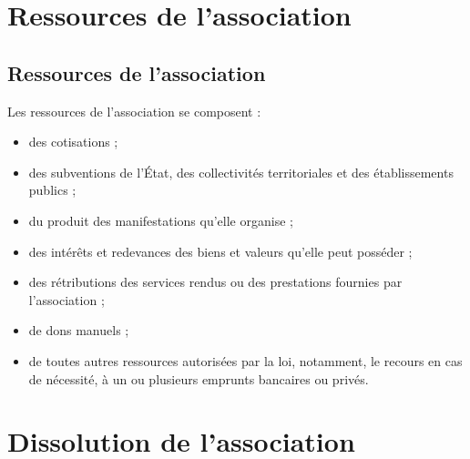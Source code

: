 \documentclass[a4paper,french,10pt]{article}
\newcommand{\article}[1]{\subsection{#1}\addtocounter{article}{1}}
\newcounter{article}
\begin{document}





\section{Ressources de l’association}

\article{Ressources de l’association}
\label{sec:ressources}
Les ressources de l’association se composent :
\begin{itemize}
\item des cotisations ;
  
\item des subventions de l’État, des collectivités territoriales et
des établissements publics ;

\item du produit des manifestations qu’elle organise ;

\item des intérêts et redevances des biens et valeurs qu’elle peut
posséder ;

\item des rétributions des services rendus ou des prestations fournies
par l'association ;

\item de dons manuels ;

\item de toutes autres ressources autorisées par la loi, notamment, le
recours en cas de nécessité, à un ou plusieurs emprunts bancaires ou
privés.
\end{itemize}


\section{Dissolution de l’association}
\end{document}
